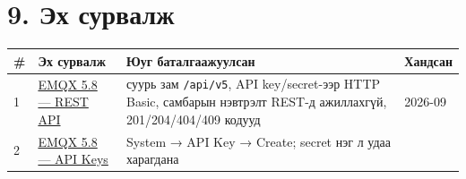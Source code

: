 \hypertarget{ux44dux445-ux441ux443ux440ux432ux430ux43bux436}{%
\section{9. Эх сурвалж}\label{ux44dux445-ux441ux443ux440ux432ux430ux43bux436}}

\begingroup\scriptsize\begin{longtable}[]{@{}llll@{}}
\toprule
\begin{minipage}[b]{0.22\columnwidth}\raggedright
\#\strut
\end{minipage} & \begin{minipage}[b]{0.22\columnwidth}\raggedright
Эх сурвалж\strut
\end{minipage} & \begin{minipage}[b]{0.22\columnwidth}\raggedright
Юуг баталгаажуулсан\strut
\end{minipage} & \begin{minipage}[b]{0.22\columnwidth}\raggedright
Хандсан\strut
\end{minipage}\tabularnewline
\midrule
\endhead
\begin{minipage}[t]{0.22\columnwidth}\raggedright
1\strut
\end{minipage} & \begin{minipage}[t]{0.22\columnwidth}\raggedright
\href{https://docs.emqx.com/en/emqx/v5.8/guides/api.html}{EMQX 5.\allowbreak{}8 --- REST API}\strut
\end{minipage} & \begin{minipage}[t]{0.22\columnwidth}\raggedright
суурь зам \texttt{/api/v5}, API key/secret-ээр HTTP Basic, самбарын нэвтрэлт REST-д ажиллахгүй, 201/204/404/409 кодууд\strut
\end{minipage} & \begin{minipage}[t]{0.22\columnwidth}\raggedright
2026-09\strut
\end{minipage}\tabularnewline
\begin{minipage}[t]{0.22\columnwidth}\raggedright
2\strut
\end{minipage} & \begin{minipage}[t]{0.22\columnwidth}\raggedright
\href{https://docs.emqx.com/en/emqx/v5.8/guides/api-keys.html}{EMQX 5.\allowbreak{}8 --- API Keys}\strut
\end{minipage} & \begin{minipage}[t]{0.22\columnwidth}\raggedright
System → API Key → Create; secret нэг л удаа харагдана\strut
\end{minipage} & \begin{minipage}[t]{0.22\columnwidth}\raggedright

\end{minipage}
\end{longtable}
